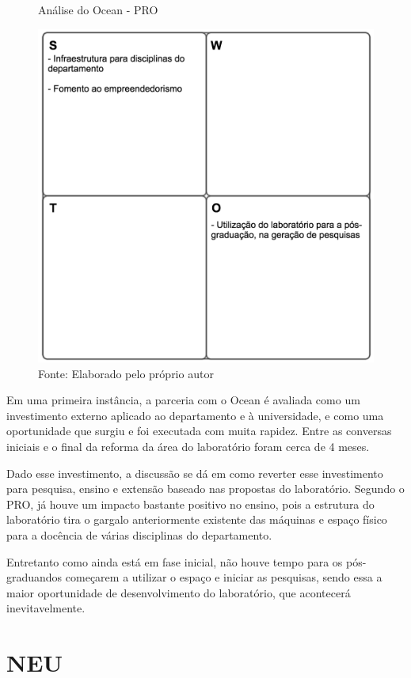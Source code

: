 \begin{figure}[H]
\caption{Análise do Ocean - PRO}
\centerline{\includegraphics[scale=0.75]{img/proswot}}
\label{fig:swotpro}
\caption* {Fonte: Elaborado pelo próprio autor}
\end{figure}

Em uma primeira instância, a parceria com o Ocean é avaliada como um investimento externo aplicado ao departamento e à universidade, e como uma oportunidade que surgiu e foi executada com muita rapidez. Entre as conversas iniciais e o final da reforma da área do laboratório foram cerca de 4 meses.

Dado esse investimento, a discussão se dá em como reverter esse investimento para pesquisa, ensino e extensão baseado nas propostas do laboratório. Segundo o PRO, já houve um impacto bastante positivo no ensino, pois a estrutura do laboratório tira o gargalo anteriormente existente das máquinas e espaço físico para a docência de várias disciplinas do departamento.

Entretanto como ainda está em fase inicial, não houve tempo para os pós-graduandos começarem a utilizar o espaço e iniciar as pesquisas, sendo essa a maior oportunidade de desenvolvimento do laboratório, que acontecerá inevitavelmente.

\section{NEU}

